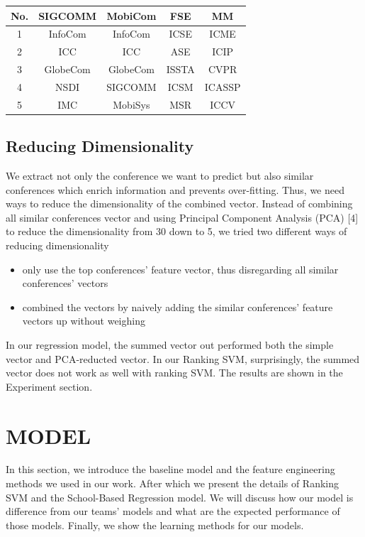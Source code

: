 \documentclass[letterpaper]{article}
\begin{document}
\begin{table}[h]
    \centering
    \begin{tabular}{c|c|c|c|c}
        \hline
        No.& SIGCOMM & MobiCom & FSE & MM\\
        \hline
        1 & InfoCom & InfoCom & ICSE & ICME \\
        2 & ICC & ICC & ASE & ICIP\\
        3 & GlobeCom & GlobeCom & ISSTA & CVPR\\
        4 & NSDI & SIGCOMM & ICSM & ICASSP\\
        5 & IMC & MobiSys & MSR & ICCV\\
        \hline
    \end{tabular}
\end{table}
\subsection{Reducing Dimensionality}
We extract not only the conference we want to predict but also similar conferences which enrich information and prevents over-fitting. Thus, we need ways to reduce the dimensionality of the combined vector. Instead of combining all similar conferences vector and using Principal Component Analysis (PCA) [4] to reduce the dimensionality from 30 down to 5, we tried two different ways of reducing dimensionality
\begin{itemize}
    \item only use the top conferences' feature vector, thus disregarding all similar conferences' vectors
    \item combined the vectors by naively adding the similar conferences'  feature vectors up without weighing
\end{itemize} In our regression model, the summed vector out performed both the simple vector and PCA-reducted vector. In our Ranking SVM, surprisingly, the summed vector does not work as well with ranking SVM. The results are shown in the Experiment section.

\section{MODEL}
In this section, we introduce the baseline model and the feature engineering methods we used in our work. After which we present the details of Ranking SVM and the School-Based Regression model. We will discuss how our model is difference from our teams' models and what are the expected performance of those models. Finally, we show the learning methods for our models.
\end{document}
